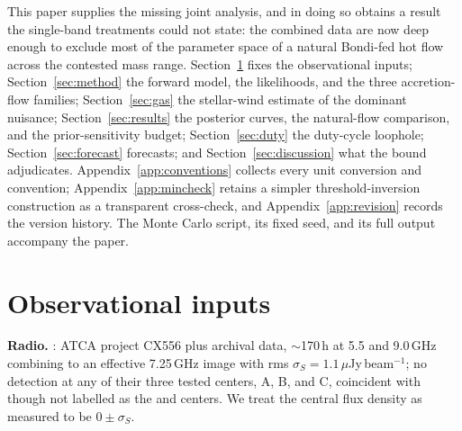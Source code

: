 \documentclass[11pt]{article}
\begin{document}
This paper supplies the missing joint analysis, and in doing so obtains a result the single-band treatments could not state: the combined data are now deep enough to exclude most of the parameter space of a natural Bondi-fed hot flow across the contested mass range. Section~\ref{sec:data} fixes the observational inputs; Section~\ref{sec:method} the forward model, the likelihoods, and the three accretion-flow families; Section~\ref{sec:gas} the stellar-wind estimate of the dominant nuisance; Section~\ref{sec:results} the posterior curves, the natural-flow comparison, and the prior-sensitivity budget; Section~\ref{sec:duty} the duty-cycle loophole; Section~\ref{sec:forecast} forecasts; and Section~\ref{sec:discussion} what the bound adjudicates. Appendix~\ref{app:conventions} collects every unit conversion and convention; Appendix~\ref{app:mincheck} retains a simpler threshold-inversion construction as a transparent cross-check, and Appendix~\ref{app:revision} records the version history. The Monte Carlo script, its fixed seed, and its full output accompany the paper.

\section{Observational inputs}
\label{sec:data}

\textbf{Radio.} \citet{Mahida2026}: ATCA project CX556 plus archival data, $\sim$170\,h at 5.5 and 9.0\,GHz combining to an effective 7.25\,GHz image with rms $\sigma_S = 1.1\,\mu$Jy\,beam$^{-1}$; no detection at any of their three tested centers, A, B, and C, coincident with though not labelled as the \citet{vanderMarelAnderson2010} and \citet{Noyola2008,Noyola2010} centers. We treat the central flux density as measured to be $0 \pm \sigma_S$.
\end{document}
